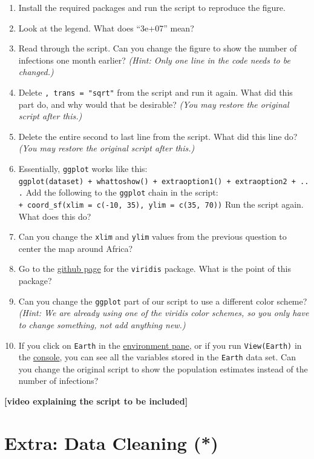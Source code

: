\documentclass[
]{book}
\providecommand{\tightlist}{%
  \setlength{\itemsep}{0pt}\setlength{\parskip}{0pt}}
\begin{document}
\begin{enumerate}
\def\labelenumi{\arabic{enumi}.}
\tightlist
\item
  Install the required packages and run the script to reproduce the figure.
\item
  Look at the legend. What does ``3e+07'' mean?
\item
  Read through the script. Can you change the figure to show the number of infections one month earlier? \emph{(Hint: Only one line in the code needs to be changed.)}
\item
  Delete \texttt{,\ trans\ =\ "sqrt"} from the script and run it again. What did this part do, and why would that be desirable? \emph{(You may restore the original script after this.)}
\item
  Delete the entire second to last line from the script. What did this line do? \emph{(You may restore the original script after this.)}
\item
  Essentially, \texttt{ggplot} works like this: \texttt{ggplot(dataset)\ +\ whattoshow()\ +\ extraoption1()\ +\ extraoption2\ +\ ...} Add the following to the \texttt{ggplot} chain in the script: \texttt{+\ coord\_sf(xlim\ =\ c(-10,\ 35),\ ylim\ =\ c(35,\ 70))} Run the script again. What does this do?
\item
  Can you change the \texttt{xlim} and \texttt{ylim} values from the previous question to center the map around Africa?
\item
  Go to the \href{https://github.com/sjmgarnier/viridis/\#the-color-maps}{github page} for the \texttt{viridis} package. What is the point of this package?
\item
  Can you change the \texttt{ggplot} part of our script to use a different color scheme? \emph{(Hint: We are already using one of the viridis color schemes, so you only have to change something, not add anything new.)}
\item
  If you click on \texttt{Earth} in the \href{https://youtu.be/AHAR7j-IUOw?t=162}{environment pane}, or if you run \texttt{View(Earth)} in the \href{https://youtu.be/AHAR7j-IUOw?t=133}{console}, you can see all the variables stored in the \texttt{Earth} data set. Can you change the original script to show the population estimates instead of the number of infections?
\end{enumerate}

\textbf{{[}video explaining the script to be included{]}}

\hypertarget{extra-data-cleaning}{%
\section{Extra: Data Cleaning (*)}\label{extra-data-cleaning}}
\end{document}
